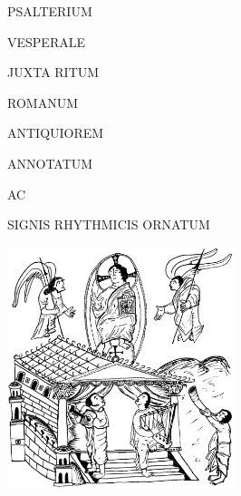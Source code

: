 






\begin{center}

\color{benred8}

{\fontsize{2.660cm}{5 em}\selectfont

PSALTERIUM

}

\vspace*{15 pt}

{\fontsize{2.975cm}{5 em}\selectfont

VESPERALE

}

\vspace*{20 pt}

{\fontsize{1.5cm}{1 em}\selectfont

JUXTA RITUM

\vspace*{2.7 mm}

ROMANUM

\vspace*{5 mm}

ANTIQUIOREM

}

\vspace*{5 mm}

\begin{Huge}

ANNOTATUM

\end{Huge}\begin{Large}

AC

\vspace*{-1.0 mm}

\end{Large}\begin{Huge}

SIGNIS RHYTHMICIS ORNATUM

\end{Huge}

\vspace*{8 mm}

\includegraphics[height=7.06cm]{CoverImage02_s.png}


\end{center}
